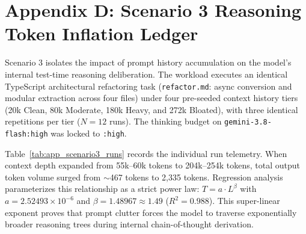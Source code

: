 \documentclass[10pt,twocolumn,a4paper]{article}
\begin{document}
\clearpage
\section*{Appendix D: Scenario 3 Reasoning Token Inflation Ledger}

Scenario 3 isolates the impact of prompt history accumulation on the model's internal test-time reasoning deliberation. The workload executes an identical TypeScript architectural refactoring task (\texttt{refactor.md}: async conversion and modular extraction across four files) under four pre-seeded context history tiers (20k Clean, 80k Moderate, 180k Heavy, and 272k Bloated), with three identical repetitions per tier ($N = 12$ runs). The thinking budget on \texttt{gemini-3.8-flash:high} was locked to \texttt{:high}.

Table~\ref{tab:app_scenario3_runs} records the individual run telemetry. When context depth expanded from 55k--60k tokens to 204k--254k tokens, total output token volume surged from $\sim$467 tokens to 2,335 tokens. Regression analysis parameterizes this relationship as a strict power law: $T = a \cdot L^{\beta}$ with $a = 2.52493 \times 10^{-6}$ and $\beta = 1.48967 \approx 1.49$ ($R^2 = 0.988$). This super-linear exponent proves that prompt clutter forces the model to traverse exponentially broader reasoning trees during internal chain-of-thought derivation.
\end{document}
